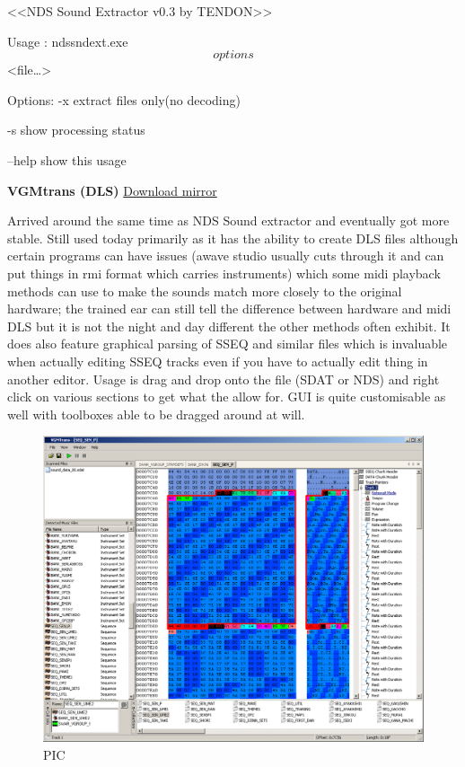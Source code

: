 \documentclass[
]{book}
\begin{document}
\textless﻿\textless NDS Sound Extractor v0.3 by TENDON\textgreater﻿\textgreater{}

Usage : ndssndext.exe \[options\] \textless file\ldots\textgreater{}

Options: -x extract files only(no decoding)

-s show processing status

--help show this usage

\textbf{VGMtrans (DLS)} \href{http://filetrip.net/nds-downloads/utilities/download-vgmtrans-92909-f27960.html}{Download mirror}

Arrived around the same time as NDS Sound extractor and eventually got more stable. Still used today primarily as it has the ability to create DLS files although certain programs can have issues (awave studio usually cuts through it and can put things in rmi format which carries instruments) which some midi playback methods can use to make the sounds match more closely to the original hardware; the trained ear can still tell the difference between hardware and midi DLS but it is not the night and day different the other methods often exhibit. It does also feature graphical parsing of SSEQ and similar files which is invaluable when actually editing SSEQ tracks even if you have to actually edit thing in another editor. Usage is drag and drop onto the file (SDAT or NDS) and right click on various sections to get what the allow for. GUI is quite customisable as well with toolboxes able to be dragged around at will.

\begin{figure}
\centering
\includegraphics{images/136_home_fast6191_romhackingguide_unrenamed_files_and_original_borders_romhackguidevgmtrans.png}
\caption{PIC}
\end{figure}
\end{document}
